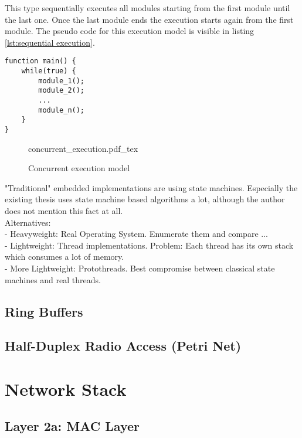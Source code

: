 This type sequentially executes all modules starting from the first module until the last one. Once the last module ends the execution starts again from the first module. The pseudo code for this execution model is visible in listing \ref{lst:sequential execution}.

\noindent\begin{minipage}{\textwidth}
\begin{lstlisting}[frame=single,caption=Sequential execution pseudo code,label=lst:sequential execution]
function main() {
    while(true) {
        module_1();
        module_2();
        ...
        module_n();
    }
}
\end{lstlisting}
\end{minipage}


\begin{figure}
\centering
{concurrent_execution.pdf_tex}
\caption[]{Concurrent execution model}
\end{figure}

"Traditional" embedded implementations are using state machines. Especially the existing thesis uses state machine based algorithms a lot, although the author does not mention this fact at all. \\

Alternatives: \\
- Heavyweight: Real Operating System. Enumerate them and compare ... \\
- Lightweight: Thread implementations. Problem: Each thread has its own stack which consumes a lot of memory. \\
- More Lightweight: Protothreads. Best compromise between classical state machines and real threads. \\

\section{Ring Buffers}
\section{Half-Duplex Radio Access (Petri Net)}

\chapter{Network Stack}
\section{Layer 2a: MAC Layer}
